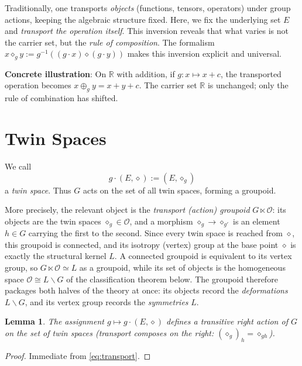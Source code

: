 \documentclass[11pt,a4paper]{article}
\newtheorem{lemma}[theorem]{Lemma}
\begin{document}
	\begin{tcolorbox}[title=Box 1: Operations vs.~Objects – An Inversion of Priority, colback=gray!5!white, colframe=gray!75!black]
		Traditionally, one transports \emph{objects} (functions, tensors, operators) under group actions, keeping the algebraic structure fixed. Here, we fix the underlying set $E$ and \emph{transport the operation itself}. This inversion reveals that what varies is not the carrier set, but the \emph{rule of composition}. The formalism $x \diamond_g y := g^{-1}((g\cdot x) \diamond (g\cdot y))$ makes this inversion explicit and universal.
		
		\medskip
		\textbf{Concrete illustration}: On $\mathbb{R}$ with addition, if $g: x \mapsto x + c$, the transported operation becomes $x \oplus_g y = x + y + c$. The carrier set $\mathbb{R}$ is unchanged; only the rule of combination has shifted.
	\end{tcolorbox}
	
	\section{Twin Spaces}
	
	We call
	\[
	g \cdot (E, \diamond) := (E, \diamond_g)
	\]
	a \emph{twin space}. Thus $G$ acts on the set of all twin spaces, forming a groupoid.

More precisely, the relevant object is the \emph{transport (action) groupoid} $G\ltimes\mathcal O$: its objects
are the twin spaces $\diamond_g\in\mathcal O$, and a morphism $\diamond_g\to\diamond_{g'}$ is an element $h\in G$
carrying the first to the second. Since every twin space is reached from $\diamond$, this groupoid is connected,
and its isotropy (vertex) group at the base point $\diamond$ is exactly the structural kernel $L$. A connected
groupoid is equivalent to its vertex group, so $G\ltimes\mathcal O\simeq L$ as a groupoid, while its set of
objects is the homogeneous space $\mathcal O\cong L\backslash G$ of the classification theorem below. The
groupoid therefore packages both halves of the theory at once: its objects record the \emph{deformations}
$L\backslash G$, and its vertex group records the \emph{symmetries} $L$.
	
	\begin{lemma}
		The assignment $g \mapsto g \cdot (E, \diamond)$ defines a transitive right action of $G$ on the set of twin spaces (transport composes on the right: $(\diamond_g)_h = \diamond_{gh}$).
	\end{lemma}
	\begin{proof}
		Immediate from \eqref{eq:transport}.
	\end{proof}
	
\end{document}
